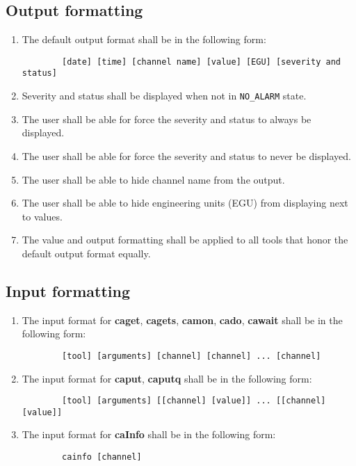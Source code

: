 \documentclass[12pt,a4paper]{article}
\begin{document}
\subsection{Output formatting}
\begin{enumerate}
	\item The default output format shall be in the following form: 
	\begin{verbatim}
		[date] [time] [channel name] [value] [EGU] [severity and status]
	\end{verbatim}
	\item Severity and status shall be displayed when not in \texttt{NO\_ALARM} state.
	\item The user shall be able for force the severity and status to always be displayed.
	\item The user shall be able for force the severity and status to never be displayed.
	\item The user shall be able to hide channel name from the output.
	\item The user shall be able to hide engineering units (EGU) from displaying next to values.
	\item The value and output formatting shall be applied to all tools that honor the default output format equally.
\end{enumerate}

\subsection{Input formatting}
\begin{enumerate}
	\item The input format for \textbf{caget}, \textbf{cagets}, \textbf{camon}, \textbf{cado}, \textbf{cawait} shall be in the following form:
	\begin{verbatim}
		[tool] [arguments] [channel] [channel] ... [channel]
	\end{verbatim}	
	\item The input format for \textbf{caput}, \textbf{caputq} shall be in the following form:
	\begin{verbatim}
		[tool] [arguments] [[channel] [value]] ... [[channel] [value]]
	\end{verbatim}
	\item The input format for \textbf{caInfo} shall be in the following form:
	\begin{verbatim}
		cainfo [channel]
	\end{verbatim}
\end{enumerate}



\end{document}
